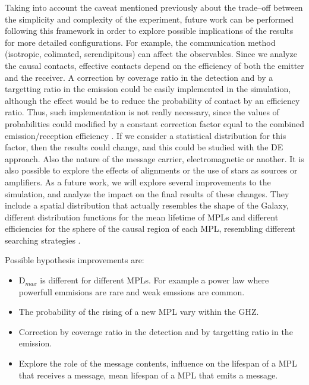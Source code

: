 \documentclass[crop]{CSLB}
\begin{document}
Taking into account the caveat mentioned previously about the
trade--off between the simplicity and complexity of the experiment,
future work can be performed following this framework in order to
explore possible implications of the results for more detailed
configurations.
%
For example, the communication method (isotropic, colimated,
serendipitous) can affect the observables.
%
Since we analyze the causal contacts, effective contacts depend on the
efficiency of both the emitter and the receiver.
%
A correction by coverage ratio in the detection and by a targetting
ratio in the emission could be easily implemented in the simulation,
although the effect would be to reduce the probability of contact by
an efficiency ratio.
%
Thus, such implementation is not really necessary, since the values of
probabilities could modified by a constant correction factor equal to
the combined emission/reception efficiency
\citep{smith_broadcasting_2009, anchordoqui_upper_2019,
forgan_collimated_2014}.
%
If we consider a statistical distribution for this factor, then the
results could change, and this could be studied with the DE approach.
%
Also the nature of the message carrier, electromagnetic or another.
%
It is also possible to explore the effects of alignments or the use of
stars as sources or amplifiers.
%
%
As a future work, we will explore several improvements to the
simulation, and analyze the impact on the final results of these
changes.
%
They include a spatial distribution that actually resembles the shape
of the Galaxy, different distribution functions for the mean lifetime
of MPLs and different efficiencies for the sphere of the causal region
of each MPL, resembling different searching strategies
\citep{hippke_interstellar_2017}.


Possible hypothesis improvements are:

\begin{itemize}
   \item D$_{max}$ is different for different MPLs.  For example a power
      law where powerfull emmisions are rare and weak emssions are
      common.
   \item The probability of the rising of a new MPL vary within the GHZ.
   \item Correction by coverage ratio in the detection and by
      targetting ratio in the emission.
   \item Explore the role of the message
      contents, influence on the lifespan of a MPL that receives a
      message, mean lifespan of a MPL that emits a message.
\end{itemize} 

 






\end{document}
